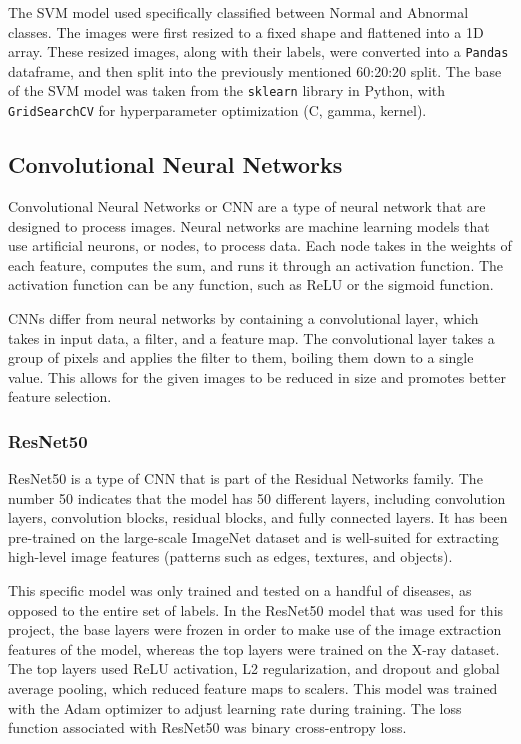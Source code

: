 \documentclass{article}
\theoremstyle{plain}
\theoremstyle{definition}
\theoremstyle{remark}
\begin{document}
The SVM model used specifically classified between Normal and Abnormal classes. The images were first
resized to a fixed shape and flattened into a 1D array. These resized images, along with their labels,
were converted into a \texttt{Pandas} dataframe, and then split into the previously mentioned 60:20:20 split.
The base of the SVM model was taken from the \texttt{sklearn} library in Python, with \texttt{GridSearchCV} for
hyperparameter optimization (C, gamma, kernel).

\subsection{Convolutional Neural Networks}
\label{section:cnn}
Convolutional Neural Networks or CNN are a type of neural network that are designed to process images.
Neural networks are machine learning models that use artificial neurons, or nodes, to process data.
Each node takes in the weights of each feature, computes the sum, and runs it through an activation
function. The activation function can be any function, such as ReLU or the sigmoid function. 

CNNs differ from neural networks by containing a convolutional layer, which takes in input data,
a filter, and a feature map. The convolutional layer takes a group of pixels and applies the filter
to them, boiling them down to a single value. This allows for the given images to be reduced in size and
promotes better feature selection. 

\subsubsection{ResNet50}
ResNet50 is a type of CNN that is part of the Residual Networks family. The number 50 indicates that
the model has 50 different layers, including convolution layers, convolution blocks, residual blocks,
and fully connected layers. It has been pre-trained on the large-scale ImageNet dataset and is
well-suited for extracting high-level image features (patterns such as edges, textures, and objects). 

This specific model was only trained and tested on a handful of diseases, as opposed to the entire
set of labels. In the ResNet50 model that was used for this project, the base layers were frozen in order to make
use of the image extraction features of the model, whereas the top layers were trained on the X-ray
dataset. The top layers used ReLU activation, L2 regularization, and dropout and global
average pooling, which reduced feature maps to scalers. This model was trained with the Adam optimizer
to adjust learning rate during training. The loss function associated with ResNet50 was binary
cross-entropy loss.
\end{document}
